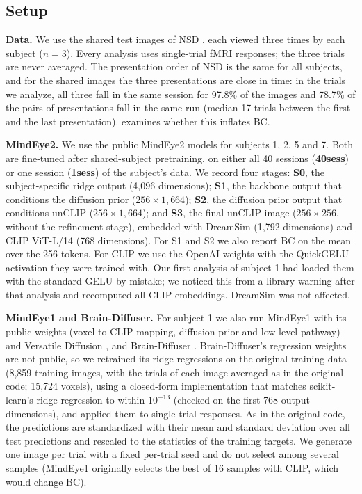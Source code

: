 \documentclass[11pt,a4paper]{article}
\begin{document}
\subsection{Setup}
\label{sec:nsd-setup}

\textbf{Data.} We use the shared test images of NSD \citep{allen2022}, each
viewed three times by each subject ($n=3$). Every analysis uses single-trial
fMRI responses; the three trials are never averaged. The presentation order of
NSD is the same for all subjects, and for the shared images the three
presentations are close in time: in the trials we analyze, all three fall in
the same session for 97.8\% of the images and 78.7\% of the pairs of
presentations fall in the same run (median 17 trials between the first and the
last presentation).  examines whether this inflates BC.

\textbf{MindEye2.} We use the public MindEye2 models \citep{scotti2024} for
subjects 1, 2, 5 and 7. Both are fine-tuned after shared-subject pretraining,
on either all 40 sessions (\textbf{40sess}) or one session (\textbf{1sess}) of
the subject's data. We record four stages: \textbf{S0}, the subject-specific ridge
output (4,096 dimensions); \textbf{S1}, the backbone output that conditions the
diffusion prior ($256\times1{,}664$); \textbf{S2}, the diffusion prior output
that conditions unCLIP ($256\times1{,}664$); and \textbf{S3}, the final unCLIP
image ($256\times256$, without the refinement stage), embedded with DreamSim
\citep{fu2023} (1,792 dimensions) and CLIP ViT-L/14 \citep{radford2021} (768
dimensions). For S1 and S2 we also report BC on the mean over the 256 tokens.
For CLIP we use the OpenAI weights with the QuickGELU activation they were
trained with. Our first analysis of subject 1 had loaded them with the standard
GELU by mistake; we noticed this from a library warning after that analysis and
recomputed all CLIP embeddings. DreamSim was not affected.

\textbf{MindEye1 and Brain-Diffuser.} For subject 1 we also run MindEye1
\citep{scotti2023} with its public weights (voxel-to-CLIP mapping, diffusion
prior and low-level pathway) and Versatile Diffusion \citep{xu2023vd}, and
Brain-Diffuser \citep{ozcelik2023}. Brain-Diffuser's regression weights are not
public, so we retrained its ridge regressions on the original training data
(8,859 training images, with the trials of each image averaged as in the
original code; 15,724 voxels), using a closed-form implementation that matches
scikit-learn's ridge regression to within $10^{-13}$ (checked on the first 768
output dimensions), and applied them to single-trial responses. As in the
original code, the predictions are standardized with their mean and standard
deviation over all test predictions and rescaled to the statistics of the
training targets. We
generate one image per trial with a fixed per-trial seed and do not select among
several samples (MindEye1 originally selects the best of 16 samples with CLIP,
which would change BC).
\end{document}
